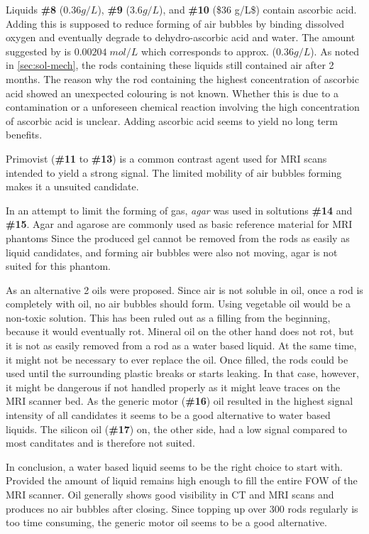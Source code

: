 Liquids \textbf{\#8} ($0.36 g/L$), \textbf{\#9} ($3.6 g/L$), and \textbf{\#10} (\$36 g/L\$) contain ascorbic acid.
Adding this is supposed to reduce forming of air bubbles by binding dissolved oxygen and eventually degrade to dehydro-ascorbic acid and water.
The amount suggested by \cite{Abtahi2008, Bodannes1979} is $0.00204 \; mol/L$ which corresponds to approx. ($0.36 g/L$).
As noted in \ref{sec:sol-mech}, the rods containing these liquids still contained air after 2 months.
The reason why the rod containing the highest concentration of ascorbic acid showed an unexpected colouring is not known.
Whether this is due to a contamination or a unforeseen chemical reaction involving the high concentration of ascorbic acid is unclear.
Adding ascorbic acid seems to yield no long term benefits.

Primovist (\textbf{\#11} to \textbf{\#13}) is a common contrast agent used for MRI scans \cite{VanBeers2012, Rohrer, primovist} intended to yield a strong signal.
The limited mobility of air bubbles forming makes it a unsuited candidate.

In an attempt to limit the forming of gas, \textit{agar} was used in soltutions \textbf{\#14} and \textbf{\#15}.
Agar and agarose are commonly used as basic reference material for MRI phantoms \cite{BuccioliniCiraolo1989, Mathur-DeVre1985}
Since the produced gel cannot be removed from the rods as easily as liquid candidates, and forming air bubbles were also not moving, agar is not suited for this phantom.

As an alternative 2 oils were proposed.
Since air is not soluble in oil, once a rod is completely with oil, no air bubbles should form.
Using vegetable oil would be a non-toxic solution.
This has been ruled out as a filling from the beginning, because it would eventually rot.
Mineral oil on the other hand does not rot, but it is not as easily removed from a rod as a water based liquid.
At the same time, it might not be necessary to ever replace the oil.
Once filled, the rods could be used until the surrounding plastic breaks or starts leaking.
In that case, however, it might be dangerous if not handled properly as it might leave traces on the MRI scanner bed.
As the generic motor (\textbf{\#16}) oil resulted in the highest signal intensity of all candidates it seems to be a good alternative to water based liquids.
The silicon oil (\textbf{\#17}) on, the other side, had a low signal compared to most canditates and is therefore not suited.

In conclusion, a water based liquid seems to be the right choice to start with.
Provided the amount of liquid remains high enough to fill the entire FOW of the MRI scanner.
Oil generally shows good visibility in CT and MRI scans and produces no air bubbles after closing.
Since topping up over 300 rods regularly is too time consuming, the generic motor oil seems to be a good alternative.

